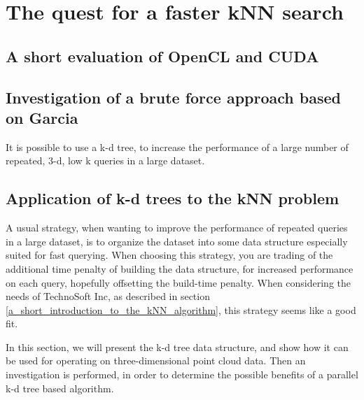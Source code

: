 
\chapter{The quest for a faster kNN search} %
\label{sec:the_quest_for_a_faster_knn_search}

\section{A short evaluation of OpenCL and CUDA} %
\label{sub:a_short_evaluation_of_opencl_and_cuda}


\section{Investigation of a brute force approach based on Garcia} %
\label{sub:investigation_of_a_brute_force_approach_based_on_garcia}


\begin{myrq}
\label{rq:structure_aml}
    It is possible to use a k-d tree, to increase the performance of a large number of repeated, 3-d, low k queries in a large dataset.
\end{myrq}


\section{Application of k-d trees to the kNN problem} %
\label{sub:application_of_kd_trees_to_the_knn_problem}

A usual strategy, when wanting to improve the performance of repeated queries in a large dataset, is to organize the dataset into some data structure especially suited for fast querying. When choosing this strategy, you are trading of the additional time penalty of building the data structure, for increased performance on each query, hopefully offsetting the build-time penalty. When considering the needs of TechnoSoft Inc, as described in section \ref{a_short_introduction_to_the_kNN_algorithm}, this strategy seems like a good fit.

In this section, we will present the k-d tree data structure, and show how it can be used for operating on three-dimensional point cloud data. Then an investigation is performed, in order to determine the possible benefits of a parallel k-d tree based algorithm.


